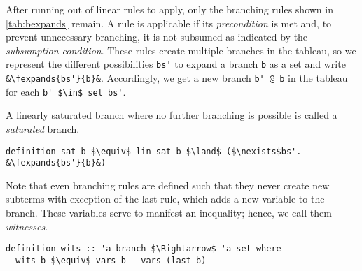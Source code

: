 \documentclass[sigplan,10pt,anonymous,review]{acmart}
\newcommand{\lefttrianglebar}{\mathrel{\tikz[baseline]{\draw (1ex, 0.75ex) -- (0, 1.25ex) -- (0, 0.25ex) -- cycle; \draw (0, 0.75ex) -- (1ex, 0.75ex);}}}
\newcommand{\fexpands}[2]{#1 $\lefttrianglebar$ #2}
\newcommand{\inS}{\in_\text{s}}
\newcommand{\notinS}{\notin_\text{s}}
\begin{document}
After running out of linear rules to apply, only the branching rules shown in \autoref{tab:bexpands} remain.
A rule is applicable if its \textit{precondition} is met and, to prevent unnecessary branching, it is not subsumed as indicated by the \textit{subsumption condition}.
These rules create multiple branches in the tableau, so we represent the different possibilities \lstinline!bs'! to expand a branch \lstinline!b! as a set and write \lstinline!&\fexpands{bs'}{b}&!. 
Accordingly, we get a new branch \lstinline!b' @ b! in the tableau for each \lstinline!b' $\in$ set bs'!.

A linearly saturated branch where no further branching is possible is called a \textit{saturated} branch. 
\begin{lstlisting}
definition sat b $\equiv$ lin_sat b $\land$ ($\nexists$bs'. &\fexpands{bs'}{b}&)
\end{lstlisting}

Note that even branching rules are defined such that they never create new subterms with exception of the last rule, which adds a new variable to the branch.
These variables serve to manifest an inequality; hence, we call them \textit{witnesses}.
\begin{lstlisting}
definition wits :: 'a branch $\Rightarrow$ 'a set where
  wits b $\equiv$ vars b - vars (last b)
\end{lstlisting}
\end{document}
